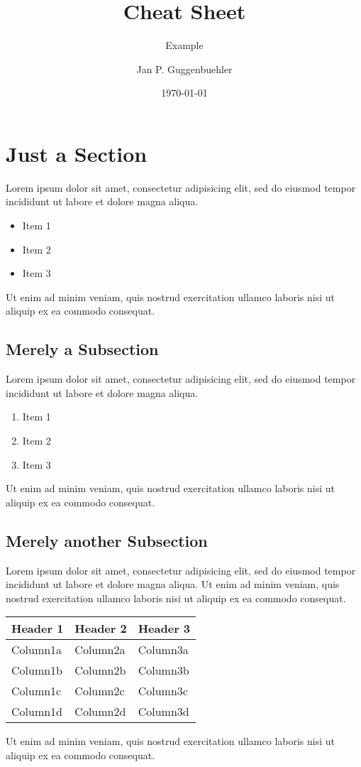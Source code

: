 \documentclass{modernCS}
\begin{document}
\title{Cheat Sheet}
\subtitle{Example}
\author{Jan P. Guggenbuehler}
\date{\today{}}
\maketitle

\section{Just a Section}
Lorem ipsum dolor sit amet, consectetur adipisicing elit, sed do eiusmod
tempor incididunt ut labore et dolore magna aliqua.
\begin{itemize}
	\item Item 1
	\item Item 2
	\item Item 3
\end{itemize}
Ut enim ad minim veniam,
quis nostrud exercitation ullamco laboris nisi ut aliquip ex ea commodo
consequat.

\subsection{Merely a Subsection}
Lorem ipsum dolor sit amet, consectetur adipisicing elit, sed do eiusmod
tempor incididunt ut labore et dolore magna aliqua.
\begin{enumerate}
	\item Item 1
	\item Item 2
	\item Item 3
\end{enumerate}
Ut enim ad minim veniam,
quis nostrud exercitation ullamco laboris nisi ut aliquip ex ea commodo
consequat.

\subsection{Merely another Subsection}
Lorem ipsum dolor sit amet, consectetur adipisicing elit, sed do eiusmod
tempor incididunt ut labore et dolore magna aliqua. Ut enim ad minim veniam, quis nostrud exercitation ullamco laboris nisi ut aliquip ex ea commodo consequat.
\begin{center}
\begin{tabular}{lll}
\toprule
Header 1 & Header 2 & Header 3 \\
\midrule
Column1a & Column2a & Column3a \\
Column1b & Column2b & Column3b \\
Column1c & Column2c & Column3c \\
Column1d & Column2d & Column3d \\
\bottomrule
\end{tabular}
\end{center}
Ut enim ad minim veniam,
quis nostrud exercitation ullamco laboris nisi ut aliquip ex ea commodo
consequat.
\end{document}
